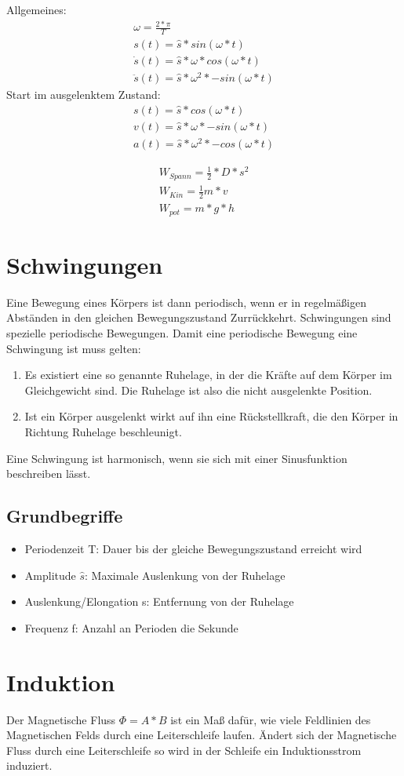 \documentclass{article}
\begin{document}
Allgemeines:
\begin{gather*}
    \omega = \frac{2*\pi}{T}\\
    s(t) = \hat{s} * sin(\omega*t)\\
    \dot{s}(t) = \hat{s} * \omega * cos(\omega*t)\\
    \ddot{s}(t) = \hat{s} * \omega^2 * -sin(\omega*t)
\end{gather*}
Start im ausgelenktem Zustand:
\begin{gather*}
    s(t) = \hat{s} * cos(\omega*t)\\
    v(t) = \hat{s} * \omega * -sin(\omega*t)\\
    a(t) = \hat{s} * \omega^2 * -cos(\omega*t)
\end{gather*}

\begin{gather*}
    W_{Spann} = \frac{1}{2} * D * s^2\\
    W_{Kin} = \frac{1}{2}  m * v\\
    W_{pot} = m*g*h
\end{gather*}

\section*{Schwingungen}
Eine Bewegung eines Körpers ist dann periodisch, wenn er in regelmäßigen
Abständen in den gleichen Bewegungszustand Zurrückkehrt. Schwingungen sind
spezielle periodische Bewegungen. Damit eine periodische Bewegung eine Schwingung
ist muss gelten:
\begin{enumerate}
    \item Es existiert eine so genannte Ruhelage, in der die Kräfte auf
    dem Körper im Gleichgewicht sind. Die Ruhelage ist also die nicht ausgelenkte Position.
    \item  Ist ein Körper ausgelenkt wirkt auf ihn eine Rückstellkraft, die den Körper in Richtung Ruhelage beschleunigt.
\end{enumerate}
Eine Schwingung ist harmonisch, wenn sie sich mit einer Sinusfunktion \\beschreiben lässt.
\subsection*{Grundbegriffe}
\begin{itemize}
    \item Periodenzeit T: Dauer bis der gleiche Bewegungszustand erreicht wird
    \item Amplitude $\hat{s}$: Maximale Auslenkung von der Ruhelage
    \item Auslenkung/Elongation s: Entfernung von der Ruhelage
    \item Frequenz f: Anzahl an Perioden die Sekunde
\end{itemize}

\section*{Induktion}
Der Magnetische Fluss $\Phi = A * B$ ist ein Maß dafür, wie viele Feldlinien des Magnetischen Felds durch eine Leiterschleife laufen.
Ändert sich der Magnetische Fluss durch eine Leiterschleife so wird in der Schleife ein Induktionsstrom induziert.
\end{document}
